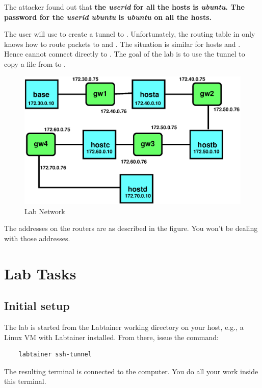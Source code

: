 The attacker found out that
\textbf{the \textit{userid} for all the hosts is \textit{ubuntu}.  The
  password for the \textit{userid} \textit{ubuntu} is \textit{ubuntu}
  on all the hosts.}


The user will use \ssh to create a tunnel to . Unfortunately, the routing
table in  only knows how to route packets to \base and
. The situation is similar for hosts  and
.  Hence \base cannot connect directly to
.  The goal of the lab is to use the tunnel to copy a
file from  to \base.


\begin{center}
\begin{figure}[h]
  \includegraphics[scale=0.9]{network}
  \caption{\label{fig:1} Lab Network}
\end{figure}  
\end{center}

The addresses on the routers are as described in the figure. You won't
be dealing with those addresses.

\section{Lab Tasks}

\subsection{Initial setup}
The lab is started from the Labtainer working 
directory on your host, e.g., a Linux VM with Labtainer installed.
From there, issue the command:
\begin{verbatim}
    labtainer ssh-tunnel
\end{verbatim}

The resulting terminal is connected to the \base computer. You do all
your work inside this terminal.  

